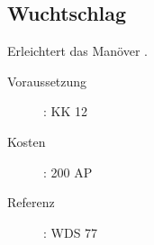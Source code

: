 \subsection{Wuchtschlag}
\label{sf.wuchtschlag}
Erleichtert das Manöver .
\begin{description}
    \item[Voraussetzung]:
        KK 12
    \item [Kosten]:
        200 AP
    \item [Referenz]:
        WDS 77
\end{description}
